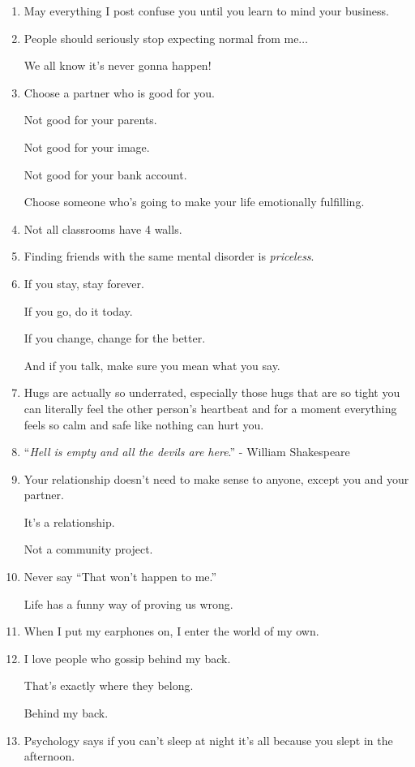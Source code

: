 \documentclass{article}
\numberwithin{equation}{section}
\begin{document}
\begin{enumerate}
    \textbf{Be their peace, not their problem.}
    \item May everything I post confuse you until you learn to mind your business.
    \item People should seriously stop expecting normal from me$\ldots$
    
    We all know it's never gonna happen!
    \item Choose a partner who is good for you.
    
    Not good for your parents.
    
    Not good for your image.
    
    Not good for your bank account.
    
    Choose someone who's going to make your life emotionally fulfilling.
    \item Not all classrooms have 4 walls.
    \item Finding friends with the same mental disorder is \textit{priceless}.
    \item If you stay, stay forever.
    
    If you go, do it today.
    
    If you change, change for the better.
    
    And if you talk, make sure you mean what you say.
    \item Hugs are actually so underrated, especially those hugs that are so tight you can literally feel the other person's heartbeat and for a moment everything feels so calm and safe like nothing can hurt you.
    \item ``\textit{Hell is empty and all the devils are here}.'' - William Shakespeare
    \item Your relationship doesn't need to make sense to anyone, except you and your partner.
    
    It's a relationship.
    
    Not a community project.
    \item Never say ``That won't happen to me.''
    
    Life has a funny way of proving us wrong.
    \item When I put my earphones on, I enter the world of my own.
    \item I love people who gossip behind my back.
    
    That's exactly where they belong.
    
    Behind my back.
    \item Psychology says if you can't sleep at night it's all because you slept in the afternoon.
    

\end{enumerate}
\end{document}
